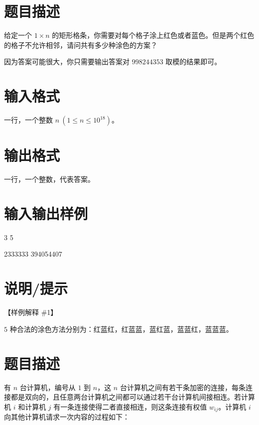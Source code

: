 \documentclass{ctpro}
\begin{document}
\makeproblem
\section*{题目描述}

给定一个 $1 \times n$ 的矩形格条，你需要对每个格子涂上红色或者蓝色。但是两个红色的格子不允许相邻，请问共有多少种涂色的方案？

因为答案可能很大，你只需要输出答案对 $998244353$ 取模的结果即可。

\section*{输入格式}

一行，一个整数 $n~(1 \leq n \leq {10}^{18})$。

\section*{输出格式}

一行，一个整数，代表答案。

\section*{输入输出样例}

\testcasetab
{
    3
}
{
    5
}

\testcasetab
{
    2333333
}
{
    394054407
}

\section*{说明/提示}

【样例解释 \#1】

$5$ 种合法的涂色方法分别为：红蓝红，红蓝蓝，蓝红蓝，蓝蓝红，蓝蓝蓝。

\makeproblem
\section*{题目描述}

有 $n$ 台计算机，编号从 $1$ 到 $n$，这 $n$ 台计算机之间有若干条加密的连接，每条连接都是双向的，且任意两台计算机之间都可以通过若干台计算机间接相连。若计算机 $i$ 和计算机 $j$ 有一条连接使得二者直接相连，则这条连接有权值 $w_{ij}$。计算机 $i$ 向其他计算机请求一次内容的过程如下：

\end{document}
